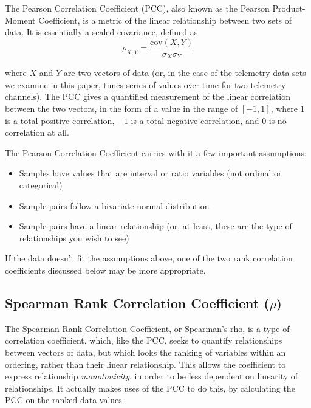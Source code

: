 The Pearson Correlation Coefficient (PCC), also known as the Pearson Product-Moment Coefficient, is a metric of the linear relationship between two sets of data. It is essentially a scaled covariance, defined as \\

\begin{equation} \label{eq:pcc}
\rho_{X, Y} = \frac{\mathrm{cov}(X, Y)}{\sigma_{X} \sigma_{Y}}
\end{equation}

where $X$ and $Y$ are two vectors of data (or, in the case of the telemetry data sets we examine in this paper, times series of values over time for two telemetry channels). The PCC gives a quantified measurement of the linear correlation between the two vectors, in the form of a value in the range of $[-1, 1]$, where $1$ is a total positive correlation, $-1$ is a total negative correlation, and $0$ is no correlation at all.

The Pearson Correlation Coefficient carries with it a few important assumptions:

\begin{itemize}
\item Samples have values that are interval or ratio variables (not ordinal or categorical)
\item Sample pairs follow a bivariate normal distribution
\item Sample pairs have a linear relationship (or, at least, these are the type of relationships you wish to see)
\end{itemize}

If the data doesn't fit the assumptions above, one of the two rank correlation coefficients discussed below may be more appropriate.

\subsection{Spearman Rank Correlation Coefficient ($\rho$)}

The Spearman Rank Correlation Coefficient, or Spearman's rho, is a type of correlation coefficient, which, like the PCC, seeks to quantify relationships between vectors of data, but which looks the ranking of variables within an ordering, rather than their linear relationship. This allows the coefficient to express relationship \textit{monotonicity}, in order to be less dependent on linearity of relationships. It actually makes uses of the PCC to do this, by calculating the PCC on the ranked data values.

